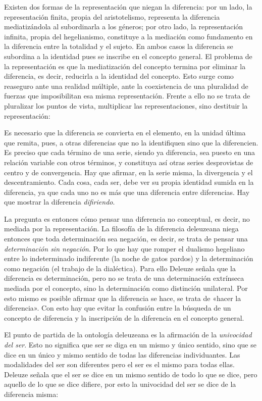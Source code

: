 Existen dos formas de la representación que niegan la diferencia: por un lado, la representación finita, propia del aristotelismo, representa la diferencia mediatizándola al subordinarla a los géneros; por otro lado, la representación infinita, propia del hegelianismo, constituye a la mediación como fundamento en la diferencia entre la totalidad y el sujeto. En ambos casos la diferencia se subordina a la identidad pues se inscribe en el concepto general. El problema de la representación es que la mediatización del concepto termina por eliminar la diferencia, es decir, reducirla a la identidad del concepto. Esto surge como reaseguro ante una realidad múltiple, ante la coexistencia de una pluralidad de fuerzas que imposibilitan esa misma representación. Frente a ello no se trata de pluralizar los puntos de vista, multiplicar las representaciones, sino destituir la representación:

Es necesario que la diferencia se convierta en el elemento, en la unidad última que remita, pues, a otras diferencias que no la identifiquen sino que la diferencien. Es preciso que cada término de una serie, siendo ya diferencia, sea puesto en una relación variable con otros términos, y constituya así otras series desprovistas de centro y de convergencia. Hay que afirmar, en la serie misma, la divergencia y el descentramiento. Cada cosa, cada ser, debe ver su propia identidad sumida en la diferencia, ya que cada uno no es más que una diferencia entre diferencias. Hay que mostrar la diferencia \emph{difiriendo}.

La pregunta es entonces cómo pensar una diferencia no conceptual, es decir, no mediada por la representación. La filosofía de la diferencia deleuzeana niega entonces que toda determinación sea negación, es decir, se trata de pensar una \emph{determinación sin negación}. Por lo que hay que romper el dualismo hegeliano entre lo indeterminado indiferente (la noche de gatos pardos) y la determinación como negación (el trabajo de la dialéctica). Para ello Deleuze señala que la diferencia es determinación, pero no se trata de una determinación extrínseca mediada por el concepto, sino la determinación como distinción unilateral. Por esto mismo es posible afirmar que la diferencia se hace, se trata de «hacer la diferencia». Con esto hay que evitar la confusión entre la búsqueda de un concepto de diferencia y la inscripción de la diferencia en el concepto general.

El punto de partida de la ontología deleuzeana es la afirmación de la \emph{univocidad del ser}. Esto no significa que ser se diga en un mismo y único sentido, sino que se dice en un único y mismo sentido de todas las diferencias individuantes. Las modalidades del ser son diferentes pero el ser es el mismo para todas ellas. Deleuze señala que el ser se dice en un mismo sentido de todo lo que se dice, pero aquello de lo que se dice difiere, por esto la univocidad del ser se dice de la diferencia misma:

